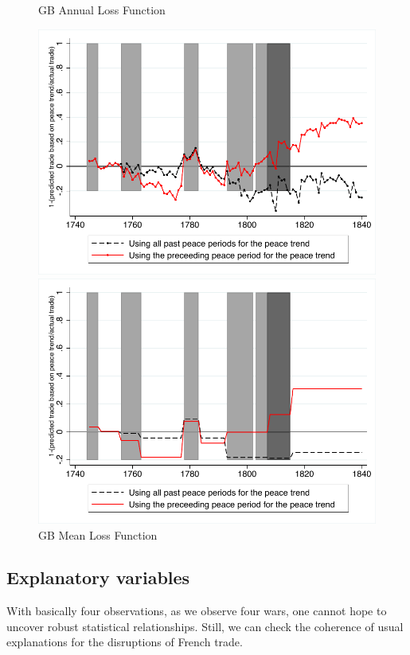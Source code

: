 \documentclass[12pt,a4paper,notitlepage,english]{article}
\begin{document}
\begin{center}
\begin{figure}[H]
\caption{GB Annual Loss Function}
\label{GBannual_loss_function}
\centering
\includegraphics[scale=0.9]{GBAnnual_loss_function.pdf}
\caption{GB Mean Loss Function}
\label{GBmean_loss_function}
\includegraphics[scale=0.9]{GBMean_loss_function.pdf}
\end{figure}
\end{center}

\subsection{Explanatory variables}

With basically four observations, as we observe four wars, one cannot hope to uncover robust statistical relationships. Still, we can check the coherence of usual explanations for the disruptions of French trade.
\end{document}
